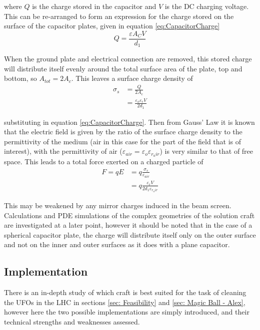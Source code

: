 \documentclass[../main.tex]{subfiles}
\begin{document}
where $Q$ is the charge stored in the capacitor and $V$ is the DC charging voltage.
This can be re-arranged  to form an expression for the charge stored on the surface of the capacitor plates, given in equation \ref{eq:CapacitorCharge}
\begin{equation} \label{eq:CapacitorCharge}
Q = \frac{\varepsilon A_{C}V}{d_{1}}
\end{equation}

When the ground plate and electrical connection are removed, this stored charge will distribute itself evenly around the total surface area of the plate, top and bottom, so $A_{tot} = 2A_{c}$.
This leaves a surface charge density of
\begin{align}
\sigma_{s} &= \frac{Q}{2A_{c}}\\
		   &= \frac{\varepsilon_{o}\varepsilon_{r}V}{2d_{1}}
\end{align}

substituting in equation \ref{eq:CapacitorCharge}.
Then from Gauss' Law it is known that the electric field is given by the ratio of the surface charge density to the permittivity of the medium (air in this case for the part of the field that is of interest), with the permittivity of air ($\varepsilon_{air} = \varepsilon_{o}\varepsilon_{r_air}$) is very similar to that of free space.
This leads to a total force exerted on a charged particle of
\begin{align}
F = qE &= q\frac{\sigma_{s}}{\varepsilon_{air}}\\
	   &= q\frac{\varepsilon_{r}V}{2d_{1}\varepsilon_{r_air}}
\end{align}

This may be weakened by any mirror charges induced in the beam screen.
Calculations and PDE simulations of the complex geometries of the solution craft are investigated at a later point, however it should be noted that in the case of a spherical capacitor plate, the charge will distribute itself only on the outer surface and not on the inner and outer surfaces as it does with a plane capacitor.

\subsection{Implementation}
There is an in-depth study of which craft is best suited for the task of cleaning the UFOs in the LHC in sections \ref{sec: Feasibility} and \ref{sec: Magic Ball - Alex}, however here the two possible implementations are simply introduced, and their technical strengths and weaknesses assessed.
\end{document}
